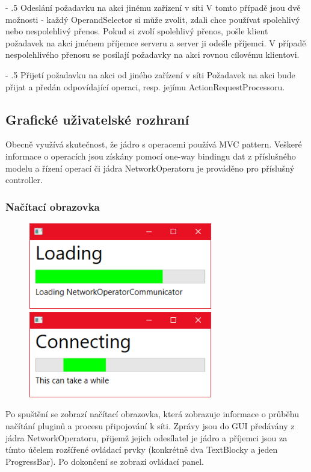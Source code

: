 \documentclass[12pt]{article}
\makeatletter
\renewcommand\paragraph{%
    \@startsection{paragraph}{4}{0mm}%
       {-\baselineskip}%
       {.5\baselineskip}%
       {\normalfont\normalsize\bfseries}}
\makeatother
\begin{document}
\paragraph{Odeslání požadavku na akci jinému zařízení v síti}
V tomto případě jsou dvě možnosti - každý OperandSelector si může zvolit, zdali chce používat spolehlivý nebo nespolehlivý přenos. Pokud si zvolí spolehlivý přenos, pošle klient požadavek na akci jménem příjemce serveru a server ji odešle příjemci. V případě nespolehlivého přenosu se posílají požadavky na akci rovnou cílovému klientovi.

\paragraph{Přijetí požadavku na akci od jiného zařízení v síti} 
Požadavek na akci bude přijat a předán odpovídající operaci, resp. jejímu ActionRequestProcessoru.

\subsection{Grafické uživatelské rozhraní}
Obecně využívá skutečnost, že jádro s operacemi používá MVC pattern. Veškeré informace o operacích jsou získány pomocí one-way bindingu dat z příslušného modelu a řízení operací či jádra NetworkOperatoru je prováděno pro příslušný controller.

\subsubsection{Načítací obrazovka}
\begin{figure}[H]
\includegraphics[width=8cm]{loading.png}
\includegraphics[width=8cm]{connecting.png}
\centering
\end{figure}
Po spuštění se zobrazí načítací obrazovka, která zobrazuje informace o průběhu načítání pluginů a procesu připojování k síti. Zprávy jsou do GUI předávány z jádra NetworkOperatoru, přijemž jejich odesílatel je jádro a příjemci jsou za tímto účelem rozšířené ovládací prvky (konkrétně dva TextBlocky a jeden ProgressBar). Po dokončení se zobrazí ovládací panel.
\end{document}
